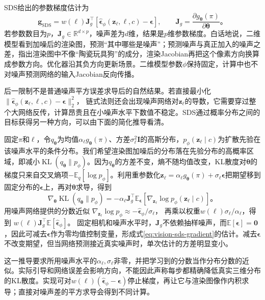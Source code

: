 SDS给出的参数梯度估计为
\begin{equation}
 \bm g_{\mathrm{SDS}}
 =w(\ell)\bm J_g^\top
     [\widehat{\bm\epsilon}_\phi(\bm z_\ell,\ell,c)
       -\bm\epsilon],
 \qquad
 \bm J_g=\frac{\partial g_{\bm\theta}(\pi)}
                 {\partial\bm\theta}\text{。}
 \label{eq:vision-sds-gradient}
\end{equation}
若参数数目为$p$，$\bm J_g\in\mathbb R^{d\times p}$，噪声差为$d$维，结果是$p$维参数梯度。白话地说，二维模型看到加噪后的渲染图，预测“其中哪些是噪声”；预测噪声与真正加入的噪声之差，指出渲染图中不像“陶瓷玩具狗”的成分，渲染Jacobian再把这个像素方向换算成参数方向。优化器沿其负方向更新场景。二维模型参数$\phi$保持固定，计算中也不对噪声预测网络的输入Jacobian反向传播。

后一限制不是普通噪声平方误差求导后的自然结果。若直接最小化
$\lVert\widehat{\bm\epsilon}_\phi(\bm z_\ell,\ell,c)-\bm\epsilon\rVert_2^2$，
链式法则还会出现噪声网络对$\bm z_\ell$的导数，它需要穿过整个大网络反传，计算昂贵且在小噪声水平下数值不稳定。SDS通过概率分布之间的目标获得另一种方向，可以由下面的简化推导看清。

固定$\pi$和$\ell$，令$q_{\bm\theta}$为均值$\alpha_\ell g_{\bm\theta}(\pi)$、方差$\sigma_\ell^2\bm I$的高斯分布，$p_\phi(\bm z_\ell\mid c)$为扩散先验在该噪声水平的条件分布。我们希望渲染图加噪后的分布落在先验分布的高概率区域，即减小$\operatorname{KL}(q_{\bm\theta}\|p_\phi)$。因为$q_{\bm\theta}$的方差不变，熵不随均值改变，KL散度对$\bm\theta$的梯度只来自交叉熵项$-\mathbb E_{q}[\log p_\phi]$。利用重参数化$\bm z_\ell=\alpha_\ell g_{\bm\theta}(\pi)+\sigma_\ell\bm\epsilon$把期望移到固定分布的$\bm\epsilon$上，再对$\bm\theta$求导，得到
\[
 \nabla_{\bm\theta}\operatorname{KL}(q_{\bm\theta}\|p_\phi)
 =-\alpha_\ell\bm J_g^\top
     \mathbb E_{\bm\epsilon}
       [\nabla_{\bm z_\ell}\log p_\phi(\bm z_\ell\mid c)]\text{。}
\]
用噪声网络提供的分数近似
$\nabla_{\bm z_\ell}\log p_\phi\approx
-\widehat{\bm\epsilon}_\phi/\sigma_\ell$，
再乘以权重$w(\ell)\sigma_\ell/\alpha_\ell$，得到
$w(\ell)\bm J_g^\top\mathbb E[\widehat{\bm\epsilon}_\phi]$。
固定相机和噪声水平时，$\bm J_g$不依赖抽样噪声，而$\mathbb E[\bm\epsilon]=\bm0$，因此可减去$\bm\epsilon$作为零均值控制变量，形成式\eqref{eq:vision-sds-gradient}的估计。减去$\bm\epsilon$不改变期望，但当网络预测接近真实噪声时，单次估计的方差明显变小。

这一推导要求所用噪声水平的$\alpha_\ell,\sigma_\ell$非零，并把学习到的分数当作分布分数的近似。实际引导和网络误差会影响方向，不能因此声称每步都精确降低真实三维分布的KL散度。实现可对$w(\ell)(\widehat{\bm\epsilon}_\phi-\bm\epsilon)$停止梯度，再让它与渲染图像作内积求导；直接对噪声差的平方求导会得到不同计算。

